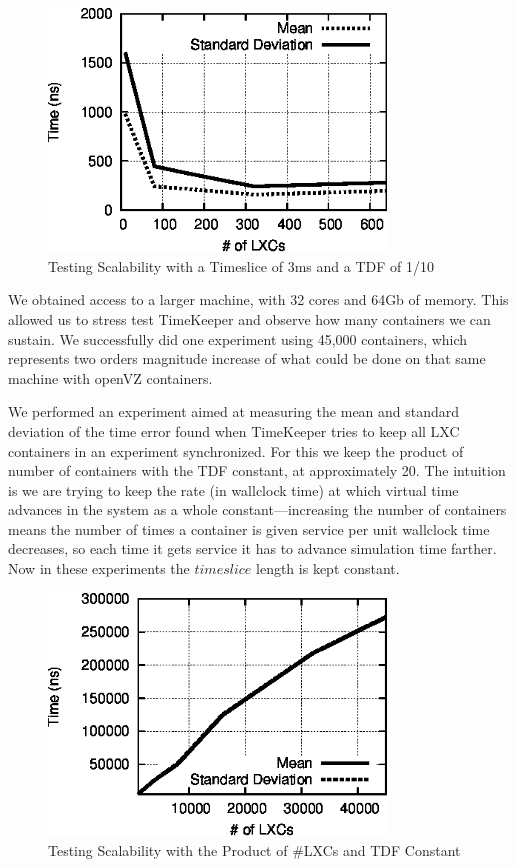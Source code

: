 \begin{figure} \centering
      \includegraphics[width=0.8\textwidth]{images/scale.eps} 
    \caption{Testing Scalability with a Timeslice of 3ms and a TDF of 1/10} 
    \label{fig:scale} 
  \end{figure} 

We obtained access to a larger machine, with 32 cores and 64Gb of memory. This allowed us to stress test TimeKeeper and observe how many containers we can sustain.  We successfully did one experiment using 45,000 containers, which represents two orders magnitude increase of what could be done on that same machine with openVZ containers. 

We performed an experiment aimed at measuring the mean and standard deviation of the time error found when TimeKeeper tries to keep all LXC containers in an experiment synchronized. For this we keep the product of number of containers with the TDF constant, at approximately 20. The intuition is we are trying to keep the rate (in wallclock time) at which virtual time advances in the system as a whole constant---increasing the number of containers means the number of times a container is given service per unit wallclock time decreases, so each time it gets service it has to advance simulation time farther. Now in these experiments the $timeslice$ length is kept constant. 

\begin{figure} \centering 
      \includegraphics[width=0.8\textwidth]{images/mean_dev_large.eps} 
    \caption{Testing Scalability with the Product of \#LXCs and TDF Constant } 
    \label{fig:lxc_tdf_constant} 
  \end{figure} 

